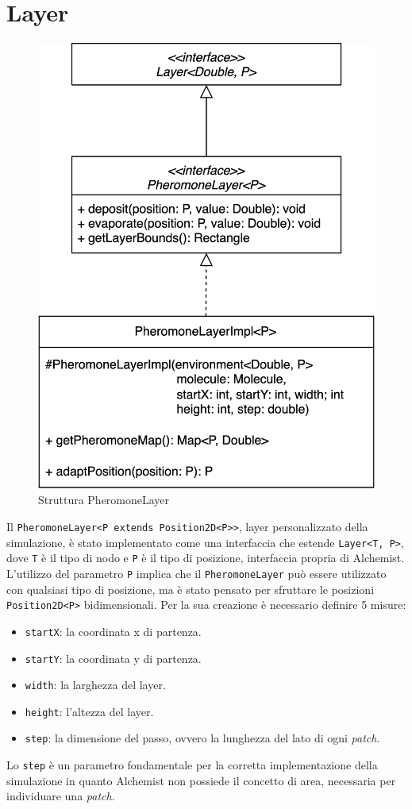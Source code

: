\section{Layer}
\begin{figure}[ht]
    \centering
    \includegraphics[width=.5\linewidth]{figures/pheromoneLayer.png}
    \caption{Struttura PheromoneLayer}\label{fig:phLayer}
\end{figure}
Il \texttt{PheromoneLayer<P extends Position2D<P>>}, layer personalizzato della simulazione, è stato implementato 
come una interfaccia che estende \texttt{Layer<T, P>}, dove \texttt{T} è il tipo di nodo e \texttt{P} è il tipo di posizione,
interfaccia propria di Alchemist. L'utilizzo del parametro \texttt{P} implica che il \texttt{PheromoneLayer} può essere utilizzato con qualsiasi tipo di posizione, ma
è stato pensato per sfruttare le posizioni \texttt{Position2D<P>} bidimensionali.
Per la sua creazione è necessario definire 5 misure:
\begin{itemize}
    \item \texttt{startX}: la coordinata x di partenza.
    \item \texttt{startY}: la coordinata y di partenza.
    \item \texttt{width}: la larghezza del layer.
    \item \texttt{height}: l'altezza del layer.
    \item \texttt{step}: la dimensione del passo, ovvero la lunghezza del lato di ogni \textit{patch}.
\end{itemize}
Lo \texttt{step} è un parametro fondamentale per la corretta implementazione della simulazione
in quanto Alchemist non possiede il concetto di area, necessaria per individuare una \textit{patch}.

